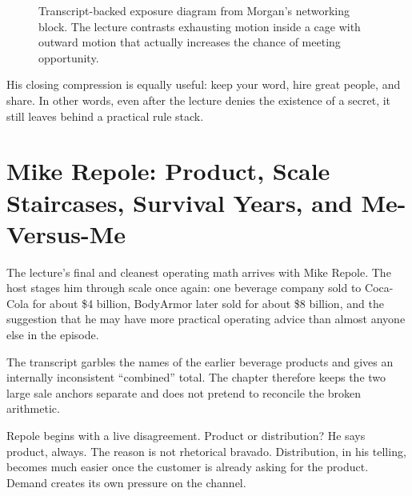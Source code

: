 \begin{figure}[h]
\centering
{}
\caption{Transcript-backed exposure diagram from Morgan's networking block. The lecture contrasts exhausting motion inside a cage with outward motion that actually increases the chance of meeting opportunity.}
\end{figure}

His closing compression is equally useful: keep your word, hire great people, and share. In other words, even after the lecture denies the existence of a secret, it still leaves behind a practical rule stack.

\section{Mike Repole: Product, Scale Staircases, Survival Years, and Me-Versus-Me}

The lecture's final and cleanest operating math arrives with Mike Repole. The host stages him through scale once again: one beverage company sold to Coca-Cola for about \$4 billion, BodyArmor later sold for about \$8 billion, and the suggestion that he may have more practical operating advice than almost anyone else in the episode.

\begin{remark}
The transcript garbles the names of the earlier beverage products and gives an internally inconsistent ``combined'' total. The chapter therefore keeps the two large sale anchors separate and does not pretend to reconcile the broken arithmetic.
\end{remark}

Repole begins with a live disagreement. Product or distribution? He says product, always. The reason is not rhetorical bravado. Distribution, in his telling, becomes much easier once the customer is already asking for the product. Demand creates its own pressure on the channel.


